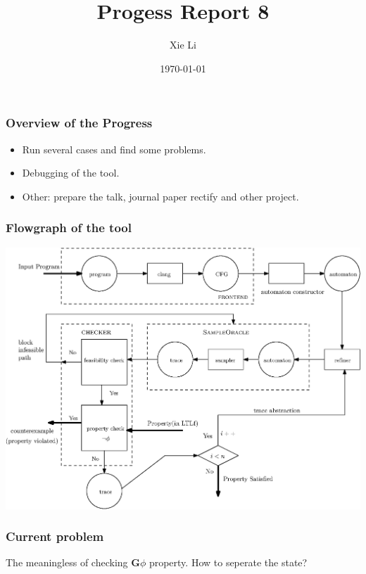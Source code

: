 \documentclass[11pt]{beamer}
\title{Progess Report 8}
\date{\today}
\author{Xie Li}
\begin{document}
\maketitle

\begin{frame}\frametitle{Overview of the Progress}
\begin{itemize}
\item Run several cases and find some problems.
\item Debugging of the tool.
\item Other: prepare the talk, journal paper rectify and other project.
\end{itemize}

\end{frame}


\begin{frame}\frametitle{Flowgraph of the tool}

\begin{center}
\includegraphics[scale=0.5]{dataflow.eps}
\end{center}

\end{frame}

\begin{frame}\frametitle{Current problem}
The meaningless of checking $\mathbf{G}\phi$ property. How to seperate the state?

\end{frame}
\end{document}
